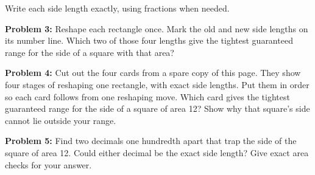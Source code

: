\documentclass[12pt]{article}
\newcommand{\problem}[2]{\par\textbf{Problem #1:} #2\par}
\begin{document}
Write each side length exactly, using fractions when needed.

\problem{3}{Reshape each rectangle once. Mark the old and new side lengths on its number line. Which two of those four lengths give the tightest guaranteed range for the side of a square with that area?}

\begin{center}
\end{center}

\newpage

\problem{4}{Cut out the four cards from a spare copy of this page. They show four stages of reshaping one rectangle, with exact side lengths. Put them in order so each card follows from one reshaping move. Which card gives the tightest guaranteed range for the side of a square of area 12? Show why that square's side cannot lie outside your range.}

\begin{center}
\end{center}
\vspace{29mm}

\problem{5}{Find two decimals one hundredth apart that trap the side of the square of area 12. Could either decimal be the exact side length? Give exact area checks for your answer.}

\vfill
\end{document}
